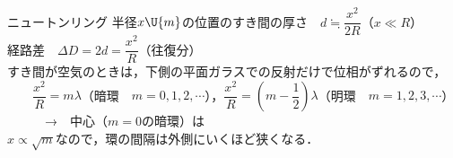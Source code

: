 \begin{matome}{ニュートンリング}
\hspace{3mm}  半径$x\U{m}$の位置のすき間の厚さ　$d\fallingdotseq\dfrac{x^2}{2R}$\hspace{4mm}（$x\ll R$）\\
\hspace{3mm}  経路差　$\Delta D=2d=\dfrac{x^2}{R}$（往復分）\\
\hspace{3mm}  すき間が空気のときは，下側の平面ガラスでの反射だけで位相が\AnaB{$\pi$}ずれるので，\\
\hspace{3mm} 　　$\dfrac{x^2}{R}=m\lambda$（暗環　$m=0,1,2,\cdots$），$\dfrac{x^2}{R}=\left(m-\dfrac{1}{2}\right)\lambda$（明環　$m=1,2,3,\cdots$）\\
\hspace{3mm} 　　　→　{\gtfamily 中心（$m=0$の暗環）は}\\
\hspace{3mm}  $x\propto\sqrt{m}$なので，環の間隔は{\gtfamily 外側にいくほど狭くなる．}
\end{matome}

